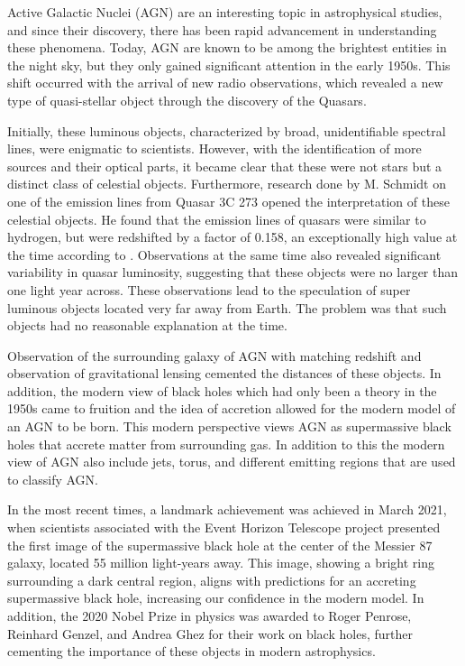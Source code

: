 \label{sec:AGN}






Active Galactic Nuclei (AGN) are an interesting topic in astrophysical studies, and 
since their discovery, there has been rapid advancement in understanding these phenomena.
Today, AGN are known to be among the brightest entities in the night sky,
but they only gained significant attention in the early 1950s. 
This shift occurred with the arrival of new radio observations, which revealed a new type of quasi-stellar
object through the discovery of the Quasars.

Initially, these luminous objects, characterized by broad, 
unidentifiable spectral lines, were enigmatic to scientists. 
However, with the identification of more sources and their optical parts, 
it became clear that these were not stars but a distinct class of celestial objects. 
Furthermore, research done by M. Schmidt on one of the emission lines from 
Quasar 3C 273 opened the interpretation of these celestial objects. 
He found that the emission lines of quasars were similar to hydrogen, but were redshifted by a factor of 0.158,
an exceptionally high value at the time according to \cite{Shields_1999}. Observations at the same time also revealed significant 
variability in quasar luminosity, suggesting that these objects were no larger than one light year across. 
These observations lead to the speculation of super luminous objects located very far away from Earth. The problem was that such objects
had no reasonable explanation at the time. %

Observation of the surrounding galaxy of AGN with matching redshift and observation of gravitational lensing cemented 
the distances of these objects. In addition, the modern view of black holes which had only been a theory in the 1950s came to
fruition and the idea of accretion allowed for the modern model of an AGN to be born. This modern perspective views AGN as supermassive black holes that
accrete matter from surrounding gas. In addition to this the modern view of AGN also include jets, torus, and different emitting regions that are used to classify AGN.

In the most recent times, a landmark achievement was achieved in March 2021, when scientists associated with the Event Horizon Telescope project 
presented the first image of the supermassive black hole at the center of the Messier 87 galaxy, located 55 million light-years away.
This image, showing a bright ring surrounding a dark central region, aligns with predictions for an accreting supermassive black hole, 
increasing our confidence in the modern model. In addition, the 2020 Nobel Prize in physics was awarded to Roger Penrose, Reinhard Genzel, and Andrea Ghez for their work on black holes, 
further cementing the importance of these objects in modern astrophysics.






